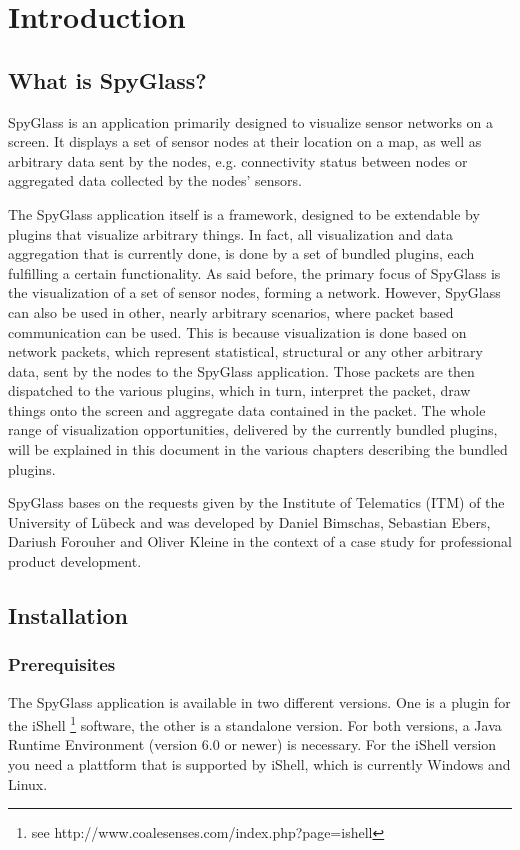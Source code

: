 \section{Introduction}
\label{section:s_introduction}

	\subsection{What is SpyGlass?}
		SpyGlass is an application primarily designed to visualize sensor networks on 
		a screen. It displays a set of sensor nodes at their location on a map, as well 
		as arbitrary data sent by the nodes, e.g. connectivity status between nodes or 
		aggregated data collected by the nodes’ sensors.
	
		The SpyGlass application itself is a framework, designed to be extendable by 
		plugins that visualize arbitrary things. In fact, all visualization and data aggregation
		that is currently done, is done by a set of bundled plugins, each fulfilling a 
		certain functionality. As said before, the primary focus of SpyGlass is the
		visualization of a set of sensor nodes, forming a network. However, SpyGlass can
		also be used in other, nearly arbitrary scenarios, where packet based communication 
		can be used. This is because visualization is done based on network packets, 
		which represent statistical, structural or any other arbitrary data, sent by the 
		nodes to the SpyGlass application. Those packets are then dispatched to the 
		various plugins, which in turn, interpret the packet, draw things onto the screen 
		and aggregate data contained in the packet. The whole range of visualization 
		opportunities, delivered by the currently bundled plugins, will be explained in 
		this document in the various chapters describing the bundled plugins.
		
		SpyGlass bases on the requests given by the Institute of Telematics (ITM) of 
		the University of Lübeck and was developed by Daniel Bimschas, Sebastian 
		Ebers, Dariush Forouher and Oliver Kleine in the context of a case study for 
		professional product development.

	\subsection{Installation}
	
		\subsubsection{Prerequisites}
			The SpyGlass application is available in two different versions. One is a plugin 
			for the iShell \footnote{see http://www.coalesenses.com/index.php?page=ishell}
			software, the other is a standalone version. For both versions, a 
			Java Runtime Environment (version 6.0 or newer) is necessary. For the iShell 
			version you need a plattform that is supported by iShell, which is currently 
			Windows and Linux.

